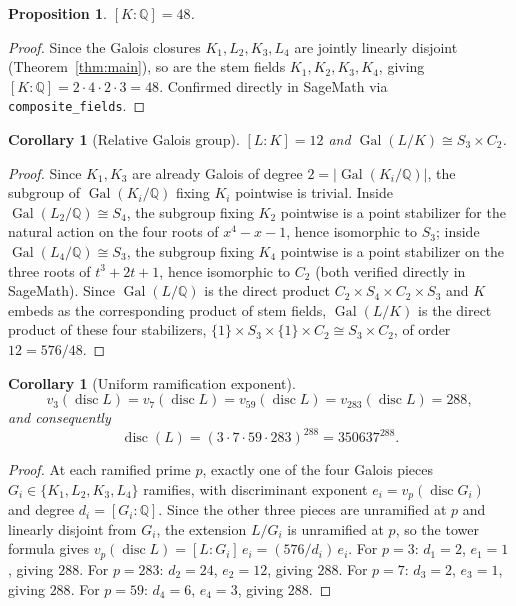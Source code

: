 \documentclass[12pt]{amsart}
\newtheorem{proposition}[theorem]{Proposition}
\newtheorem{corollary}[theorem]{Corollary}
\DeclareMathOperator{\Gal}{Gal}
\DeclareMathOperator{\disc}{disc}
\newcommand{\Q}{\mathbb{Q}}
\begin{document}
\begin{proposition}\label{prop:stemdegree}
$[K:\Q]=48$.
\end{proposition}
\begin{proof}
Since the Galois closures $K_1,L_2,K_3,L_4$ are jointly linearly disjoint
(Theorem~\ref{thm:main}), so are the stem fields $K_1,K_2,K_3,K_4$,
giving $[K:\Q]=2\cdot4\cdot2\cdot3=48$. Confirmed directly in SageMath via
\texttt{composite\_fields}.
\end{proof}

\begin{corollary}[Relative Galois group]\label{cor:relative}
$[L:K]=12$ and $\Gal(L/K)\cong S_3\times C_2$.
\end{corollary}
\begin{proof}
Since $K_1,K_3$ are already Galois of degree $2=|\Gal(K_i/\Q)|$, the
subgroup of $\Gal(K_i/\Q)$ fixing $K_i$ pointwise is trivial. Inside
$\Gal(L_2/\Q)\cong S_4$, the subgroup fixing $K_2$ pointwise is a point
stabilizer for the natural action on the four roots of $x^4-x-1$, hence
isomorphic to $S_3$; inside $\Gal(L_4/\Q)\cong S_3$, the subgroup fixing
$K_4$ pointwise is a point stabilizer on the three roots of $t^3+2t+1$,
hence
isomorphic to $C_2$ (both verified directly in SageMath). Since
$\Gal(L/\Q)$ is the direct product $C_2\times S_4\times C_2\times S_3$
and $K$ embeds as the corresponding product of stem fields, $\Gal(L/K)$
is the direct product of these four stabilizers,
$\{1\}\times S_3\times\{1\}\times C_2\cong S_3\times C_2$, of order
$12=576/48$.
\end{proof}

\begin{corollary}[Uniform ramification exponent]\label{cor:disc}
\[
v_3(\disc L)=v_7(\disc L)=v_{59}(\disc L)=v_{283}(\disc L)=288,
\]
and consequently
\[
\disc(L)=(3\cdot7\cdot59\cdot283)^{288}=350637^{288}.
\]
\end{corollary}
\begin{proof}
At each ramified prime $p$, exactly one of the four Galois pieces
$G_i\in\{K_1,L_2,K_3,L_4\}$ ramifies, with discriminant exponent
$e_i=v_p(\disc G_i)$ and degree $d_i=[G_i:\Q]$. Since the other three
pieces are unramified at $p$ and linearly disjoint from $G_i$, the
extension $L/G_i$ is unramified at $p$, so the tower formula gives
$v_p(\disc L)=[L:G_i]\,e_i=(576/d_i)\,e_i$. For $p=3$: $d_1=2$, $e_1=1$,
giving $288$. For $p=283$: $d_2=24$, $e_2=12$, giving $288$. For $p=7$:
$d_3=2$, $e_3=1$, giving $288$. For $p=59$: $d_4=6$, $e_4=3$, giving
$288$.
\end{proof}
\end{document}
